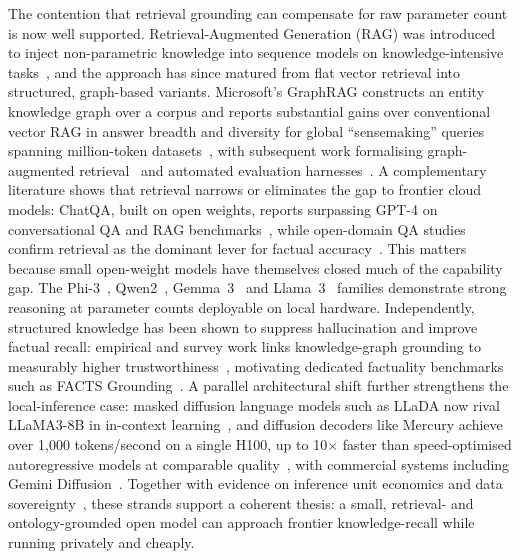 The contention that retrieval grounding can compensate for raw parameter count is now well
supported. Retrieval-Augmented Generation (RAG) was introduced to inject non-parametric
knowledge into sequence models on knowledge-intensive tasks~\cite{lewis2020rag}, and the
approach has since matured from flat vector retrieval into structured, graph-based variants.
Microsoft's GraphRAG constructs an entity knowledge graph over a corpus and reports
substantial gains over conventional vector RAG in answer breadth and diversity for
global ``sensemaking'' queries spanning million-token datasets~\cite{edge2024graphrag}, with
subsequent work formalising graph-augmented retrieval~\cite{guo2024lightrag,hu2024grag} and
automated evaluation harnesses~\cite{microsoft2025benchmarkqed}. A complementary literature
shows that retrieval narrows or eliminates the gap to frontier cloud models: ChatQA, built on
open weights, reports surpassing GPT-4 on conversational QA and RAG benchmarks~\cite{liu2024chatqa},
while open-domain QA studies confirm retrieval as the dominant lever for factual
accuracy~\cite{li2024improvingrag}. This matters because small open-weight models have
themselves closed much of the capability gap. The Phi-3~\cite{abdin2024phi3},
Qwen2~\cite{yang2024qwen2}, Gemma~3~\cite{gemma2025gemma3} and Llama~3~\cite{dubey2024llama3}
families demonstrate strong reasoning at parameter counts deployable on local hardware.
Independently, structured knowledge has been shown to suppress hallucination and improve
factual recall: empirical and survey work links knowledge-graph grounding to measurably higher
trustworthiness~\cite{agrawal2023kghallucination,sansford2024kgtrustworthy}, motivating
dedicated factuality benchmarks such as FACTS Grounding~\cite{jacovi2025facts}. A parallel
architectural shift further strengthens the local-inference case: masked diffusion language
models such as LLaDA now rival LLaMA3-8B in in-context learning~\cite{nie2025llada}, and
diffusion decoders like Mercury achieve over 1{,}000 tokens/second on a single H100, up to
10$\times$ faster than speed-optimised autoregressive models at comparable
quality~\cite{labs2025mercury}, with commercial systems including Gemini
Diffusion~\cite{deepmind2025geminidiffusion}. Together with evidence on inference unit
economics and data sovereignty~\cite{introl2026inference,advisori2026gdpr}, these strands
support a coherent thesis: a small, retrieval- and ontology-grounded open model can approach
frontier knowledge-recall while running privately and cheaply.
